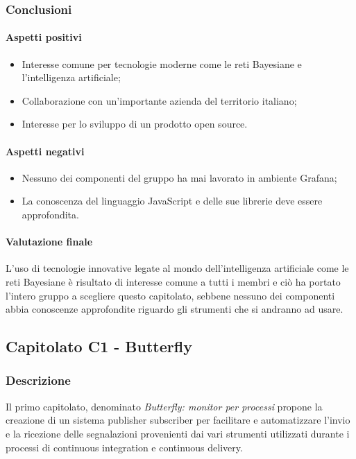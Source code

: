 	\subsubsection{Conclusioni}
		\paragraph{Aspetti positivi}
		\begin{itemize}
			\item{Interesse comune per tecnologie moderne come le reti Bayesiane e l'intelligenza artificiale;}
			\item{Collaborazione con un'importante azienda del territorio italiano;}
			\item{Interesse per lo sviluppo di un prodotto open source.}
		\end{itemize}
		\paragraph{Aspetti negativi}	
		\begin{itemize}
			\item{Nessuno dei componenti del gruppo ha mai lavorato in ambiente Grafana;}
			\item{La conoscenza del linguaggio JavaScript e delle sue librerie deve essere approfondita.}
		\end{itemize} 
		\paragraph{Valutazione finale} \Spazio
		L'uso di tecnologie innovative legate al mondo dell'intelligenza artificiale come le reti Bayesiane è risultato di interesse comune a tutti i membri e ciò ha portato l'intero gruppo a scegliere questo capitolato, sebbene nessuno dei componenti abbia conoscenze approfondite riguardo gli strumenti che si andranno ad usare.  
		\pagebreak		
		 
	\subsection{Capitolato C1 - Butterfly}
		\subsubsection{Descrizione}
	    Il primo capitolato, denominato \emph{Butterfly: monitor per processi } propone la creazione di un sistema publisher subscriber per facilitare e automatizzare l'invio e la ricezione delle segnalazioni provenienti dai vari strumenti utilizzati durante i processi di continuous integration e continuous delivery.
